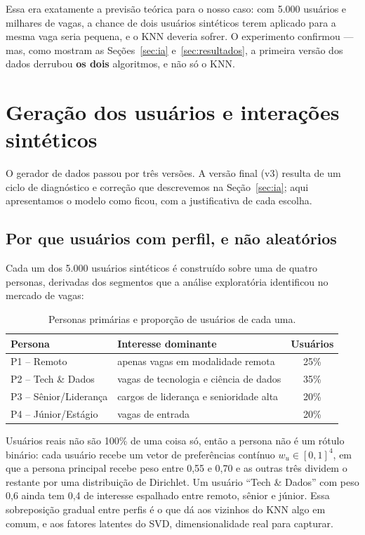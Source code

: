 \documentclass[12pt,a4paper]{article}
\begin{document}
Essa era exatamente a previsão teórica para o nosso caso: com 5.000 usuários e milhares de vagas, a chance de dois usuários sintéticos terem aplicado para a mesma vaga seria pequena, e o KNN deveria sofrer. O experimento confirmou --- mas, como mostram as Seções~\ref{sec:ia} e~\ref{sec:resultados}, a primeira versão dos dados derrubou \textbf{os dois} algoritmos, e não só o KNN.

\section{Geração dos usuários e interações sintéticos}\label{sec:sinteticos}

O gerador de dados passou por três versões. A versão final (v3) resulta de um ciclo de diagnóstico e correção que descrevemos na Seção~\ref{sec:ia}; aqui apresentamos o modelo como ficou, com a justificativa de cada escolha.

\subsection{Por que usuários com perfil, e não aleatórios}

Cada um dos 5.000 usuários sintéticos é construído sobre uma de quatro personas, derivadas dos segmentos que a análise exploratória identificou no mercado de vagas:

\begin{table}[H]
\centering
\caption{Personas primárias e proporção de usuários de cada uma.}
\begin{tabular}{llc}
\toprule
\textbf{Persona} & \textbf{Interesse dominante} & \textbf{Usuários} \\
\midrule
P1 -- Remoto & apenas vagas em modalidade remota & 25\% \\
P2 -- Tech \& Dados & vagas de tecnologia e ciência de dados & 35\% \\
P3 -- Sênior/Liderança & cargos de liderança e senioridade alta & 20\% \\
P4 -- Júnior/Estágio & vagas de entrada & 20\% \\
\bottomrule
\end{tabular}
\end{table}

Usuários reais não são 100\% de uma coisa só, então a persona não é um rótulo binário: cada usuário recebe um vetor de preferências contínuo $w_u \in [0,1]^4$, em que a persona principal recebe peso entre 0,55 e 0,70 e as outras três dividem o restante por uma distribuição de Dirichlet. Um usuário ``Tech \& Dados'' com peso 0,6 ainda tem 0,4 de interesse espalhado entre remoto, sênior e júnior. Essa sobreposição gradual entre perfis é o que dá aos vizinhos do KNN algo em comum, e aos fatores latentes do SVD, dimensionalidade real para capturar.
\end{document}
